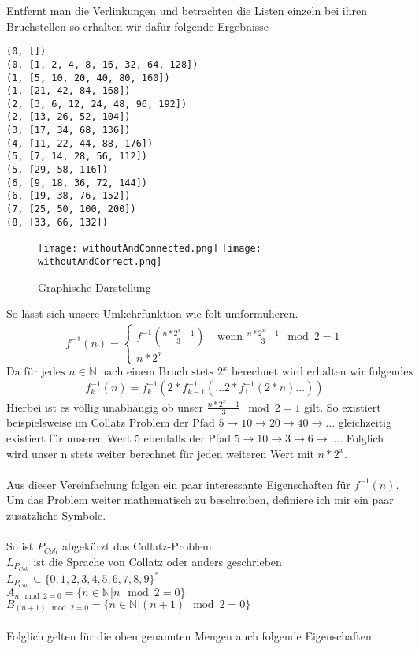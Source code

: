 \documentclass{article}
\begin{document}
Entfernt man die Verlinkungen und betrachten die Listen einzeln bei ihren Bruchstellen so erhalten wir dafür folgende Ergebnisse
\begin{verbatim}
(0, [])
(0, [1, 2, 4, 8, 16, 32, 64, 128])
(1, [5, 10, 20, 40, 80, 160])
(1, [21, 42, 84, 168])
(2, [3, 6, 12, 24, 48, 96, 192])
(2, [13, 26, 52, 104])
(3, [17, 34, 68, 136])
(4, [11, 22, 44, 88, 176])
(5, [7, 14, 28, 56, 112])
(5, [29, 58, 116])
(6, [9, 18, 36, 72, 144])
(6, [19, 38, 76, 152])
(7, [25, 50, 100, 200])
(8, [33, 66, 132])
\end{verbatim}
\blindtext
\begin{wrapfigure}
\texttt{[image: withoutAndConnected.png]}\hfill
\texttt{[image: withoutAndCorrect.png]}
\caption{Graphische Darstellung}
\end{wrapfigure}
\blindtext
So lässt sich unsere Umkehrfunktion wie folt umformulieren. \\
\begin{align*}
f^{-1}(n)=
\begin{cases}
f^{-1}(\frac{n*2^{x}-1}{3}) & \text{ wenn } \frac{n*2^{x}-1}{3} \mod 2 = 1 \\
n * 2^{x} &
\end{cases} 
\end{align*}
$\text{Da für jedes }n \in \mathbb{N} \text{ nach einem Bruch stets } 2^{x} \text{ berechnet wird erhalten wir folgendes}$
\begin{align*}
f^{-1}_{k}(n)=f^{-1}_{k}(2*f^{-1}_{k-1}(...2*f^{-1}_{1}(2*n)...))
\end{align*}
\noindent Hierbei ist es völlig unabhängig ob unser $\frac{n*2^{x}-1}{3} \mod 2 = 1$ gilt. So existiert beispielsweise im Collatz Problem der Pfad $5 \rightarrow 10 \rightarrow 20 \rightarrow 40 \rightarrow ...$ gleichzeitig existiert für unseren Wert 5 ebenfalls der Pfad $5 \rightarrow 10 \rightarrow 3 \rightarrow 6 \rightarrow ...$. Folglich wird unser n stets weiter berechnet für jeden weiteren Wert mit $n*2^x$. \\\\
Aus dieser Vereinfachung folgen ein paar interessante Eigenschaften für $f^{-1}(n)$. Um das Problem weiter mathematisch zu beschreiben, definiere ich mir ein paar zusätzliche Symbole. \\\\
So ist $P_{Coll}$ abgekürzt das Collatz-Problem. \\
$L_{P_{Coll}}$ ist die Sprache von Collatz oder anders geschrieben \\
$L_{P_{Coll}} \subseteq \{0,1,2,3,4,5,6,7,8,9\}^{*}$ \\
$A_{n \mod 2 = 0} = \{n \in \mathbb{N} \vert n \mod 2 = 0\}$ \\
$B_{(n + 1) \mod 2 = 0} = \{n \in \mathbb{N} \vert (n + 1) \mod 2 = 0\}$ \\\\
Folglich gelten für die oben genannten Mengen auch folgende Eigenschaften. \\\\
\end{document}
